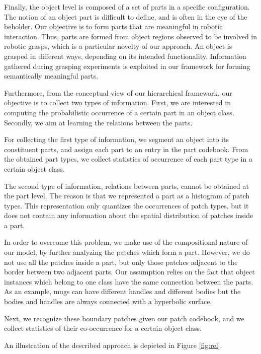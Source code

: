 \documentclass[a4paper,11pt,pdf]{pacmanreport}
\begin{document}
Finally, the object level is composed of a set of parts in a specific
configuration. The notion of an object part is difficult to define,
and is often in the eye of the beholder.  Our objective is to form
parts that are meaningful in robotic interaction.  Thus, parts are
formed from object regions observed to be involved in robotic grasps,
which is a particular novelty of our approach. An object is grasped in
different ways, depending on its intended functionality.  Information
gathered during grasping experiments is exploited in our framework for
forming semantically meaningful parts.

Furthermore, from the conceptual view of our hierarchical framework, our objective is to collect two types of information. First, we are interested in computing the probabilistic occurrence of a certain part in an object class. Secondly, we aim at learning the relations between the parts.

For collecting the first type of information, we segment an object
into its constituent parts, and assign each part to an entry in the
part codebook. From the obtained part types, we collect statistics of
occurrence of each part type in a certain object class.

The second type of information, relations between parts, cannot be
obtained at the part level. The reason is that we represented a part
as a histogram of patch types. This representation only quantizes the
occurrences of patch types, but it does not contain any information
about the spatial distribution of patches inside a part.

In order to overcome this problem, we make use of the compositional
nature of our model, by further analyzing the patches which form a
part. However, we do not use all the patches inside a part, but only
those patches adjacent to the border between two adjacent parts. Our
assumption relies on the fact that object instances which belong to
one class have the same connection between the parts. As an example,
mugs can have different handles and different bodies but the bodies
and handles are always connected with a hyperbolic surface.

Next, we recognize these boundary patches given our patch codebook,
and we collect statistics of their co-occurrence for a certain object
class.

An illustration of the described approach is depicted in Figure \ref{fig:rel}.
\end{document}
